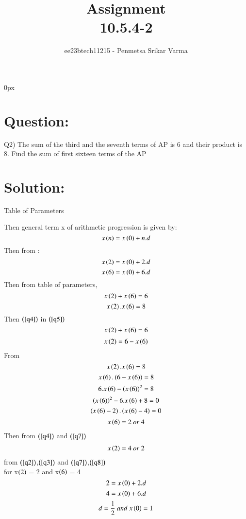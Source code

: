 \documentclass[beamer]{IEEEtran}
\theoremstyle{remark}
\begin{document}
\parindent 0px


\title{Assignment\\[1ex]10.5.4-2}
\author{ee23btech11215 - Penmetsa Srikar Varma$^{}$%
}
\maketitle
\newpage
\bigskip

\renewcommand{\thefigure}{\theenumi}
\renewcommand{\thetable}{\theenumi}
\section*{Question:}
Q2) The sum of the third and the seventh terms of AP is 6 and their product is 8. Find the sum of first sixteen terms of the AP\\
\section*{Solution:}
{
\centering
Table of Parameters\\
}
\begin{table}[h]
    \centering
    
    \label{tab:my_label}
\end{table}

Then general term x of arithmetic progression is given by:
\begin{equation}
\label{q1}
x\left(n\right)=x\left(0\right)+n.d
\end{equation}
Then from \brak{\ref{q1}}:
\begin{equation}
\label{q2}
x\left(2\right) = x\left(0\right)+2.d
\end{equation}
\begin{equation}
\label{q3}
x\left(6\right)=x\left(0\right)+6.d
\end{equation} 
Then from table of parameters,
\begin{equation}
\label{q4}
x\left(2\right)+x\left(6\right)=6
\end{equation}
\begin{equation}
\label{q5}
x\left(2\right).x\left(6\right)=8
\end{equation}
Then $\left(\ref{q4}\right)$ in $\left(\ref{q5}\right)$
$$x\left(2\right)+x\left(6\right)=6$$
\begin{align}
\label{q6}
    x\left(2\right)=6-x\left(6\right)
\end{align}
From \brak{\ref{q6}}
$$x\left(2\right).x\left(6\right)=8$$
$$x\left(6\right).\left(6-x\left(6\right)\right)=8$$
$$6.x\left(6\right)-\left(x\left(6\right)\right)^2=8$$
$$\left(x\left(6\right)\right)^2-6.x\left(6\right)+8=0$$
$$\left(x\left(6\right)-2\right).\left(x\left(6\right)-4\right)=0$$
\begin{align}
\label{q7}
    x\left(6\right)=2\ or\ 4
\end{align}
Then from $\left(\ref{q4}\right)$ and $\left(\ref{q7}\right)$
\begin{align}
\label{q8}
    x\left(2\right)=4\ or\ 2
\end{align}
from $\left(\ref{q2}\right)$,$\left(\ref{q3}\right)$ and $\left(\ref{q7}\right)$,$\left(\ref{q8}\right)$\\
for x$\left(2\right)$ = 2 and x$\left(6\right)$ = 4
$$2 = x\left(0\right)+2.d$$
$$4 = x\left(0\right)+6.d$$
$$d=\frac{1}{2}\ and\ x\brak{0}=1$$
\end{document}
